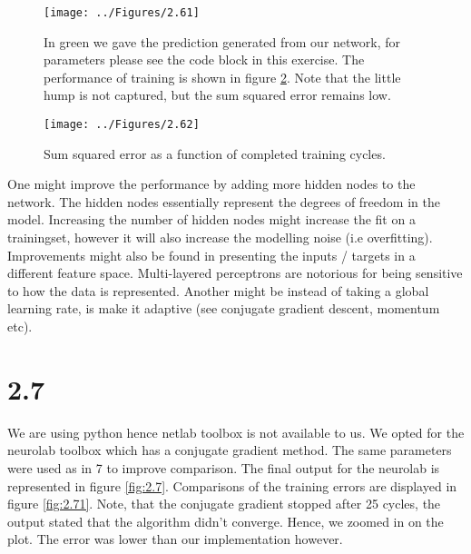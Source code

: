 \documentclass[11pt]{article}
\makeatletter
\def\maxwidth{\ifdim\Gin@nat@width>\linewidth\linewidth
    \else\Gin@nat@width\fi}
\let\Oldincludegraphics\includegraphics
\renewcommand{\includegraphics}[1]{\Oldincludegraphics[width=.8\maxwidth]{#1}}
\makeatother
\begin{document}
	\begin{figure}[H]
		\centering \texttt{[image: ../Figures/2.61]}
		\caption{In green we gave the prediction generated from our network, for parameters please see the code block in this exercise. The performance of training is shown in figure \ref{fig:2.62}. Note that the little hump is not captured, but the sum squared error remains low.}
		\label{fig:2.61}
	\end{figure}

		\begin{figure}[H]
		\centering \texttt{[image: ../Figures/2.62]}
		\caption{Sum squared error as a function of completed training cycles.}
		\label{fig:2.62}
	\end{figure}

    One might improve the performance by adding more hidden nodes to the
network. The hidden nodes essentially represent the degrees of freedom
in the model. Increasing the number of hidden nodes might increase the
fit on a trainingset, however it will also increase the modelling noise
(i.e overfitting). Improvements might also be found in presenting the
inputs / targets in a different feature space. Multi-layered perceptrons
are notorious for being sensitive to how the data is represented.
Another might be instead of taking a global learning rate, is make it
adaptive (see conjugate gradient descent, momentum etc).

    \section*{2.7}\label{section}

    We are using python hence netlab toolbox is not available to us. We
opted for the neurolab toolbox which has a conjugate gradient method.
The same parameters were used as in 7 to improve comparison. The final output for the neurolab is represented in figure \ref{fig:2.7}. Comparisons of the training errors are displayed in figure \ref{fig:2.71}. Note, that the conjugate gradient stopped after 25 cycles, the output stated that the algorithm didn't converge. Hence, we zoomed in on the plot. The error was lower than our implementation however.
\end{document}
